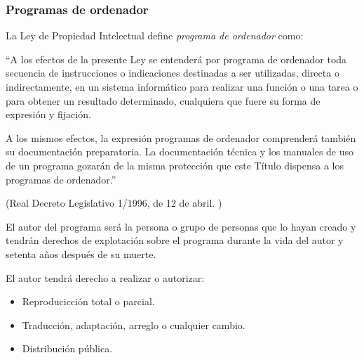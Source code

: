 
            \subsubsection{Programas de ordenador} %
            \label{ssub:ProgramasDeOrdenador}

                La Ley de Propiedad Intelectual define \textit{programa de ordenador} como:

                ``A los efectos de la presente Ley se entenderá por programa de ordenador toda secuencia de
                instrucciones o indicaciones destinadas a ser utilizadas, directa o indirectamente, en un sistema
                informático para realizar una función o una tarea o para obtener un resultado determinado, cualquiera
                que fuere su forma de expresión y fijación.

                A los mismos efectos, la expresión programas de ordenador comprenderá también su documentación
                preparatoria. La documentación técnica y los manuales de uso de un programa gozarán de la misma
                protección que este Título dispensa a los programas de ordenador.''

                \begin{flushright}
                    (Real Decreto Legislativo 1/1996, de 12 de abril. \cite{prop_intelectual})
                \end{flushright}

                El autor del programa será la persona o grupo de personas que lo hayan creado y tendrán derechos de
                explotación sobre el programa durante la vida del autor y setenta años después de su muerte.

                El autor tendrá derecho a realizar o autorizar:

                \begin{itemize}
                    \item Reproducicción total o parcial.
                    \item Traducción, adaptación, arreglo o cualquier cambio.
                    \item Distribución pública.
                \end{itemize}



